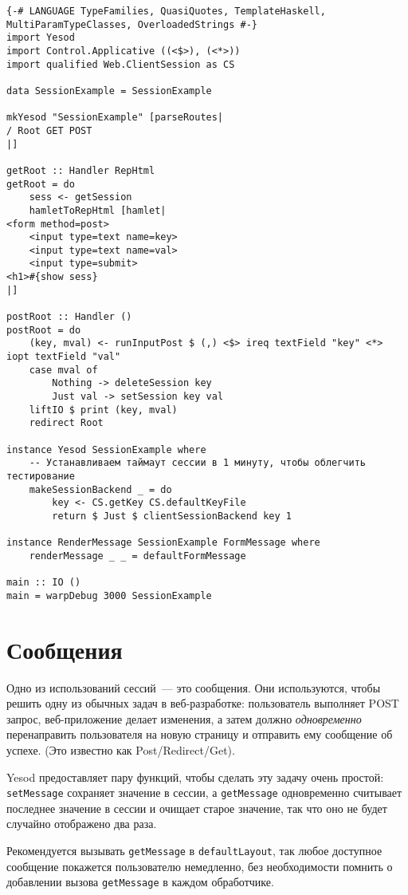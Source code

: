 \begin{lstlisting}
{-# LANGUAGE TypeFamilies, QuasiQuotes, TemplateHaskell, MultiParamTypeClasses, OverloadedStrings #-}
import Yesod
import Control.Applicative ((<$>), (<*>))
import qualified Web.ClientSession as CS

data SessionExample = SessionExample

mkYesod "SessionExample" [parseRoutes|
/ Root GET POST
|]

getRoot :: Handler RepHtml
getRoot = do
    sess <- getSession
    hamletToRepHtml [hamlet|
<form method=post>
    <input type=text name=key>
    <input type=text name=val>
    <input type=submit>
<h1>#{show sess}
|]

postRoot :: Handler ()
postRoot = do
    (key, mval) <- runInputPost $ (,) <$> ireq textField "key" <*> iopt textField "val"
    case mval of
        Nothing -> deleteSession key
        Just val -> setSession key val
    liftIO $ print (key, mval)
    redirect Root

instance Yesod SessionExample where
    -- Устанавливаем таймаут сессии в 1 минуту, чтобы облегчить тестирование
    makeSessionBackend _ = do
        key <- CS.getKey CS.defaultKeyFile
        return $ Just $ clientSessionBackend key 1

instance RenderMessage SessionExample FormMessage where
    renderMessage _ _ = defaultFormMessage

main :: IO ()
main = warpDebug 3000 SessionExample
\end{lstlisting}%

\section{Сообщения}

Одно из использований сессий~--- это сообщения. Они используются, чтобы решить одну из обычных задач в веб-разработке: пользователь выполняет POST запрос, веб-приложение делает изменения, а затем должно \emph{одновременно} перенаправить пользователя на новую страницу и отправить ему сообщение об успехе. (Это известно как Post/Redirect/Get).

Yesod предоставляет пару функций, чтобы сделать эту задачу очень простой: \lstinline'setMessage' сохраняет значение в сессии, а \lstinline'getMessage' одновременно считывает последнее значение в сессии и очищает старое значение, так что оно не будет случайно отображено два раза. 

Рекомендуется вызывать \lstinline'getMessage' в \lstinline'defaultLayout', так любое доступное сообщение покажется пользователю немедленно, без необходимости помнить о добавлении вызова \lstinline'getMessage' в каждом обработчике.

